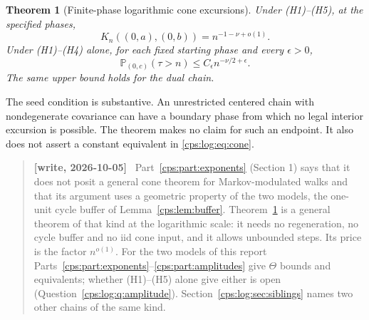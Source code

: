 \documentclass[11pt,letterpaper]{article}
\numberwithin{equation}{section}
\newtheorem{theorem}{Theorem}[section]
\theoremstyle{remark}\newtheorem{remark}[theorem]{Remark}
\newcommand{\PP}{\mathbb P}
\newenvironment{writenotelog}{\begin{quote}\small\sloppy\textbf{[write, 2026-10-05]}\ }{\end{quote}}
\begin{document}
\begin{theorem}[Finite-phase logarithmic cone excursions]\label{cps:log:thm:cone}
Under \textup{(H1)--(H5)}, at the specified phases,
\begin{equation}\label{cps:log:eq:cone}
 K_n((0,a),(0,b))=n^{-1-\nu+o(1)}.
\end{equation}
Under \textup{(H1)--(H4)} alone, for each fixed starting phase and every
$\epsilon>0$,
\begin{equation}\label{cps:log:eq:survival}
 \PP_{(0,c)}(\tau>n)\le C_\epsilon n^{-\nu/2+\epsilon}.
\end{equation}
The same upper bound holds for the dual chain.
\end{theorem}

The seed condition is substantive. An unrestricted centered chain with
nondegenerate covariance can have a boundary phase from which no legal
interior excursion is possible. The theorem makes no claim for such an
endpoint. It also does not assert a constant equivalent in
\eqref{cps:log:eq:cone}.

\begin{writenotelog}
Part~\ref{cps:part:exponents} (Section 1) says that it does not posit a general cone theorem for
Markov-modulated walks and that its argument uses a geometric property of the two models, the
one-unit cycle buffer of Lemma~\ref{cps:lem:buffer}. Theorem~\ref{cps:log:thm:cone} is a general
theorem of that kind at the logarithmic scale: it needs no regeneration, no cycle buffer and no
iid cone input, and it allows unbounded steps. Its price is the factor $n^{o(1)}$. For the two
models of this report Parts~\ref{cps:part:exponents}--\ref{cps:part:amplitudes} give $\Theta$
bounds and equivalents; whether (H1)--(H5) alone give either is open
(Question~\ref{cps:log:q:amplitude}). Section~\ref{cps:log:sec:siblings} names two other chains
of the same kind.
\end{writenotelog}
\end{document}

